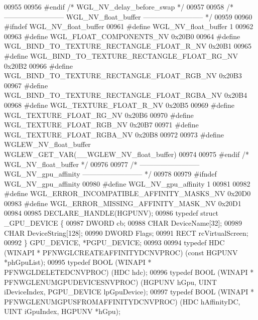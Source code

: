 \begin{DoxyCode}
00955 
00956 \textcolor{preprocessor}{#endif }\textcolor{comment}{/* WGL\_NV\_delay\_before\_swap */}\textcolor{preprocessor}{}
00957 
00958 \textcolor{comment}{/* -------------------------- WGL\_NV\_float\_buffer -------------------------- */}
00959 
00960 \textcolor{preprocessor}{#ifndef WGL\_NV\_float\_buffer}
00961 \textcolor{preprocessor}{#define WGL\_NV\_float\_buffer 1}
00962 
00963 \textcolor{preprocessor}{#define WGL\_FLOAT\_COMPONENTS\_NV 0x20B0}
00964 \textcolor{preprocessor}{#define WGL\_BIND\_TO\_TEXTURE\_RECTANGLE\_FLOAT\_R\_NV 0x20B1}
00965 \textcolor{preprocessor}{#define WGL\_BIND\_TO\_TEXTURE\_RECTANGLE\_FLOAT\_RG\_NV 0x20B2}
00966 \textcolor{preprocessor}{#define WGL\_BIND\_TO\_TEXTURE\_RECTANGLE\_FLOAT\_RGB\_NV 0x20B3}
00967 \textcolor{preprocessor}{#define WGL\_BIND\_TO\_TEXTURE\_RECTANGLE\_FLOAT\_RGBA\_NV 0x20B4}
00968 \textcolor{preprocessor}{#define WGL\_TEXTURE\_FLOAT\_R\_NV 0x20B5}
00969 \textcolor{preprocessor}{#define WGL\_TEXTURE\_FLOAT\_RG\_NV 0x20B6}
00970 \textcolor{preprocessor}{#define WGL\_TEXTURE\_FLOAT\_RGB\_NV 0x20B7}
00971 \textcolor{preprocessor}{#define WGL\_TEXTURE\_FLOAT\_RGBA\_NV 0x20B8}
00972 
00973 \textcolor{preprocessor}{#define WGLEW\_NV\_float\_buffer WGLEW\_GET\_VAR(\_\_WGLEW\_NV\_float\_buffer)}
00974 
00975 \textcolor{preprocessor}{#endif }\textcolor{comment}{/* WGL\_NV\_float\_buffer */}\textcolor{preprocessor}{}
00976 
00977 \textcolor{comment}{/* -------------------------- WGL\_NV\_gpu\_affinity -------------------------- */}
00978 
00979 \textcolor{preprocessor}{#ifndef WGL\_NV\_gpu\_affinity}
00980 \textcolor{preprocessor}{#define WGL\_NV\_gpu\_affinity 1}
00981 
00982 \textcolor{preprocessor}{#define WGL\_ERROR\_INCOMPATIBLE\_AFFINITY\_MASKS\_NV 0x20D0}
00983 \textcolor{preprocessor}{#define WGL\_ERROR\_MISSING\_AFFINITY\_MASK\_NV 0x20D1}
00984 
00985 DECLARE_HANDLE(HGPUNV);
00986 \textcolor{keyword}{typedef} \textcolor{keyword}{struct }_GPU_DEVICE \{
00987   DWORD cb; 
00988   CHAR DeviceName[32]; 
00989   CHAR DeviceString[128]; 
00990   DWORD Flags; 
00991   RECT rcVirtualScreen; 
00992 \} GPU_DEVICE, *PGPU_DEVICE;
00993 
00994 \textcolor{keyword}{typedef} HDC (WINAPI * PFNWGLCREATEAFFINITYDCNVPROC) (\textcolor{keyword}{const} HGPUNV *phGpuList);
00995 \textcolor{keyword}{typedef} BOOL (WINAPI * PFNWGLDELETEDCNVPROC) (HDC hdc);
00996 \textcolor{keyword}{typedef} BOOL (WINAPI * PFNWGLENUMGPUDEVICESNVPROC) (HGPUNV hGpu, UINT 
      iDeviceIndex, PGPU\_DEVICE lpGpuDevice);
00997 \textcolor{keyword}{typedef} BOOL (WINAPI * PFNWGLENUMGPUSFROMAFFINITYDCNVPROC) (HDC hAffinityDC, 
      UINT iGpuIndex, HGPUNV *hGpu);

\end{DoxyCode}
